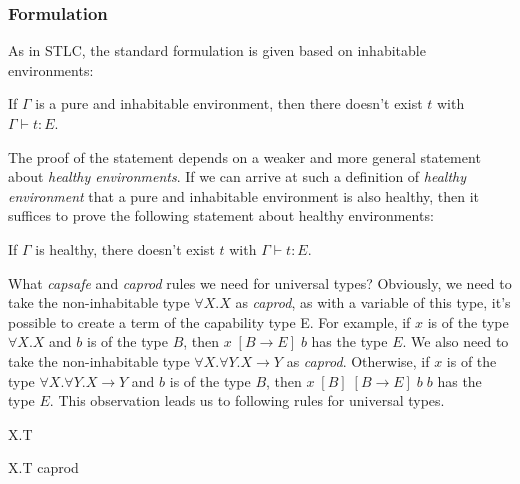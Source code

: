 \subsubsection{Formulation}

As in STLC, the standard formulation is given based on inhabitable
environments:

\begin{definition}
  If $\Gamma$ is a pure and inhabitable environment, then there
  doesn't exist $t$ with $\Gamma \vdash t : E$.
\end{definition}

The proof of the statement depends on a weaker and more general
statement about \emph{healthy environments}. If we can arrive at such
a definition of \emph{healthy environment} that a pure and inhabitable
environment is also healthy, then it suffices to prove the following
statement about healthy environments:

\begin{definition}
  If $\Gamma$ is healthy, there doesn't exist $t$ with
  $\Gamma \vdash t : E$.
\end{definition}

What \emph{capsafe} and \emph{caprod} rules we need for universal
types? Obviously, we need to take the non-inhabitable type
$\forall X.X$ as \emph{caprod}, as with a variable of this type, it's
possible to create a term of the capability type E. For example, if
$x$ is of the type $\forall X.X$ and $b$ is of the type $B$, then
$x \; [B \to E] \; b$ has the type $E$.  We also need to take the
non-inhabitable type $\forall X. \forall Y. X \to Y$ as
\emph{caprod}. Otherwise, if $x$ is of the type
$\forall X. \forall Y. X \to Y$ and $b$ is of the type $B$, then
$x \; [B] \; [B \to E] \; b \; b$ has the type $E$. This observation
leads us to following rules for universal types.

{ \forall X.T \quad {} }

{ \forall X.T \quad caprod }


